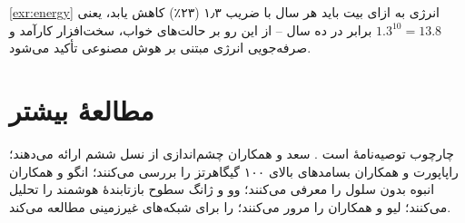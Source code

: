 \documentclass[11pt,a4paper]{article}
\begin{document}
\begin{solutionbox}{\ref{exr:energy}}
انرژی به ازای بیت باید هر سال با ضریب ۱٫۳ (۲۳٪) کاهش یابد، یعنی $1.3^{10} = 13.8$ برابر در ده سال -- از این رو بر حالت‌های خواب، سخت‌افزار کارآمد و
صرفه‌جویی انرژی مبتنی بر هوش مصنوعی تأکید می‌شود.
\end{solutionbox}

\section{مطالعهٔ بیشتر}
چارچوب  توصیه‌نامهٔ  است \cite{itu2023m2160}. سعد و همکاران \cite{saad2020vision} چشم‌اندازی از نسل ششم ارائه می‌دهند؛ راپاپورت و
همکاران \cite{rappaport2019above100} بسامدهای بالای ۱۰۰ گیگاهرتز را بررسی می‌کنند؛ انگو و همکاران \cite{ngo2017cellfree}  انبوه بدون سلول را معرفی
می‌کنند؛ وو و ژانگ \cite{wu2019irs} سطوح بازتابندهٔ هوشمند را تحلیل می‌کنند؛ لیو و همکاران \cite{liu2022isac}  را مرور می‌کنند؛ 
\cite{tr38811}  را برای شبکه‌های غیرزمینی مطالعه می‌کند.

\begin{latin}
\printbibliography[heading=subbibliography,title={References}]
\end{latin}
\end{document}
